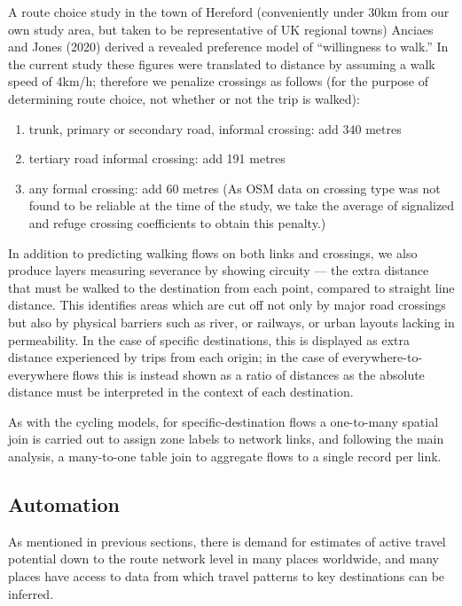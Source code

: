 \documentclass[galley]{jtlu-article-2col}
\providecommand{\tightlist}{%
  \setlength{\itemsep}{0pt}\setlength{\parskip}{0pt}}
\begin{document}
A route choice study in the town of Hereford (conveniently under 30km from our own study area, but taken to be representative of UK regional towns) Anciaes and Jones (2020) derived a revealed preference model of ``willingness to walk.''
In the current study these figures were translated to distance by assuming a walk speed of 4km/h; therefore we penalize crossings as follows (for the purpose of determining route choice, not whether or not the trip is walked):

\begin{enumerate}
\def\labelenumi{\arabic{enumi}.}
\tightlist
\item
  trunk, primary or secondary road, informal crossing: add 340 metres
\item
  tertiary road informal crossing: add 191 metres
\item
  any formal crossing: add 60 metres (As OSM data on crossing type was not found to be reliable at the time of the study, we take the average of signalized and refuge crossing coefficients to obtain this penalty.)
\end{enumerate}

In addition to predicting walking flows on both links and crossings, we also produce layers measuring severance by showing circuity --- the extra distance that must be walked to the destination from each point, compared to straight line distance.
This identifies areas which are cut off not only by major road crossings but also by physical barriers such as river, or railways, or urban layouts lacking in permeability. In the case of specific destinations, this is displayed as extra distance experienced by trips from each origin; in the case of everywhere-to-everywhere flows this is instead shown as a ratio of distances as the absolute distance must be interpreted in the context of each destination.

As with the cycling models, for specific-destination flows a one-to-many spatial join is carried out to assign zone labels to network links, and following the main analysis, a many-to-one table join to aggregate flows to a single record per link.

\hypertarget{automation}{%
\subsection{Automation}\label{automation}}

As mentioned in previous sections, there is demand for estimates of active travel potential down to the route network level in many places worldwide, and many places have access to data from which travel patterns to key destinations can be inferred.
\end{document}

